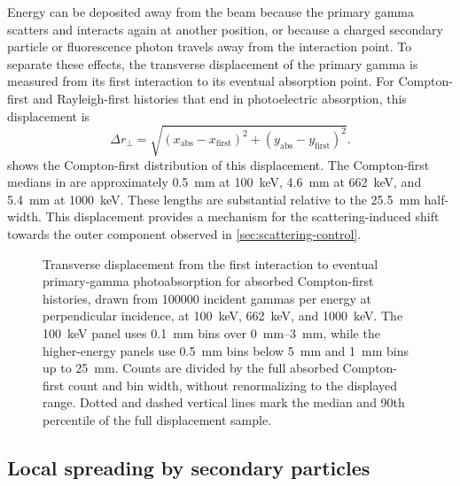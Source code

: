 Energy can be deposited away from the beam because the primary gamma scatters and interacts again at another position, or because a charged secondary particle or fluorescence photon travels away from the interaction point. To separate these effects, the transverse displacement of the primary gamma is measured from its first interaction to its eventual absorption point. For Compton-first and Rayleigh-first histories that end in photoelectric absorption, this displacement is
\begin{equation}
  \Delta r_\perp=\sqrt{(x_{\mathrm{abs}}-x_{\mathrm{first}})^2+(y_{\mathrm{abs}}-y_{\mathrm{first}})^2}.
\end{equation}
 shows the Compton-first distribution of this displacement. The Compton-first medians in  are approximately \qty{0.5}{\milli\metre} at \qty{100}{\kilo\electronvolt}, \qty{4.6}{\milli\metre} at \qty{662}{\kilo\electronvolt}, and \qty{5.4}{\milli\metre} at \qty{1000}{\kilo\electronvolt}. These lengths are substantial relative to the \qty{25.5}{\milli\metre} half-width. This displacement provides a mechanism for the scattering-induced shift towards the outer component observed in \cref{sec:scattering-control}.

\begin{figure}[!htbp]
  \captionsetup{font=small}
  \centering
  \caption{Transverse displacement from the first interaction to eventual primary-gamma photoabsorption for absorbed Compton-first  histories, drawn from \num{100000} incident gammas per energy at perpendicular incidence, at \qty{100}{\kilo\electronvolt}, \qty{662}{\kilo\electronvolt}, and \qty{1000}{\kilo\electronvolt}. The \qty{100}{\kilo\electronvolt} panel uses \qty{0.1}{\milli\metre} bins over \qtyrange{0}{3}{\milli\metre}, while the higher-energy panels use \qty{0.5}{\milli\metre} bins below \qty{5}{\milli\metre} and \qty{1}{\milli\metre} bins up to \qty{25}{\milli\metre}. Counts are divided by the full absorbed Compton-first count and bin width, without renormalizing to the displayed range. Dotted and dashed vertical lines mark the median and 90th percentile of the full displacement sample.}
  \label{fig:gamma-displacement}
\end{figure}


\subsection{Local spreading by secondary particles}

